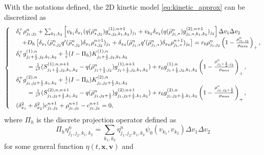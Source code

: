 \documentclass[review,onefignum,onetabnum]{siamart220329}
\begin{document}
With the notations defined, the 2D kinetic model \cref{eq:kinetic_approx} can be discretized as 
\begin{align}
\label{eq:scheme_2D}
    \begin{cases}
    & \delta_t^+ \rho_{j_1,j_2}^n +  
    \sum_{k_1,k_2} \left[v_{k_1}\delta_{x_1}(q( {\bar{\rho}}_{*,j_2}^n) g_{*,j_2,k_1,k_2}^{(1), n+1})_{j_1} +  v_{k_2}\delta_{x_2}(q( {\bar{\rho}}_{j_1,*}^n) g_{j_1,*,k_1,k_2}^{(2), n+1})_{j_2}\right]\Delta v_1 \Delta v_2\\
     & \quad + D_h \left[ \delta_{x_1}( {\bar{\rho}}_{*,j_2}^n q'( {\bar{\rho}}_{*,j_2}^n)\delta_{x_1} \rho_{*,j_2}^{n+1})_{j_1} + \delta_{x_2}( {\bar{\rho}}_{j_1,*}^n q'( {\bar{\rho}}_{j_1,*}^n)\delta_{x_2} \rho_{j_1,*}^{n+1})_{j_2} \right]
    = r_0 \rho_{j_1,j_2}^{n}\left(1 - \frac{\rho_{j_1,j_2}^n}{\rho_{\rm max}}\right)_+,\\
    &\delta_t^+ g_{j_1+\frac12,j_2,k_1, k_2}^{(1),n} + \frac{1}{\varepsilon}(I-\Pi_h) K_{j_1+\frac12,j_2,k_1, k_2}^{(1),n} \\
    &\qquad = \frac{1}{\varepsilon^2}(S_{j_1+\frac12,j_2,k_1,k_2}^{(1), n, n+1} - q( {\bar{\rho}}_{j_1+\frac12,j_2}^n) g_{j_1+\frac12,j_2,k_1,k_2}^{(1), n+1}) + r_0 g_{j_1+\frac12,j_2,k_1,k_2}^{(1),n}\left(1 - \frac{\rho_{j_1+\frac12,j_2}^n}{\rho_{\rm max}}\right)_+,\\
        &\delta_t^+ g_{j_1,j_2+\frac12,k_1, k_2}^{(2),n} + \frac{1}{\varepsilon}(I-\Pi_h) K_{j_1,j_2+\frac12,k_1, k_2}^{(2),n} \\
    & \qquad = \frac{1}{\varepsilon^2}(S_{j_1,j_2+\frac12,k_1,k_2}^{(2), n, n+1} - q( {\bar{\rho}}_{j_1,j_2+\frac12}^n) g_{j_1,j_2+\frac12,k_1,k_2}^{(2), n+1}) + r_0 g_{j_1,j_2+\frac12,k_1,k_2}^{(2),n}\left(1 - \frac{\rho_{j_1,j_2+\frac12}^n}{\rho_{\rm max}}\right)_+,\\
    & (\delta_{x_1}^2 + \delta_{x_2}^2) c_{j_1,j_2}^{n+1} + \rho_{j_1,j_2}^{n+1} - c_{j_1,j_2}^{n+1} = 0,
\end{cases}
\end{align}
where  $\Pi_h$ is the discrete projection operator defined as 
\begin{equation*}
    \Pi_h \eta_{j_1,j_2,k_1,k_2}^n = \sum_{k_1,k_2}\eta_{j_1,j_2,k_1,k_2}^n \psi_{0}(v_{k_1},v_{k_2})\Delta v_1 \Delta v_2
\end{equation*} 
for some general function $\eta(t,\mathbf{x},\mathbf{v})$ and 
\end{document}
